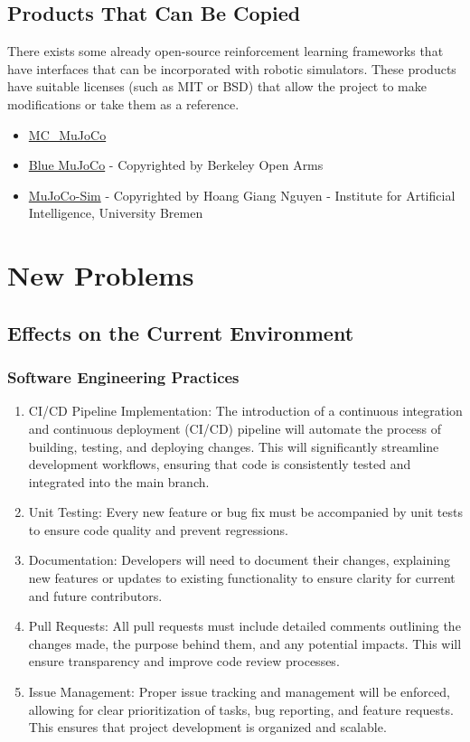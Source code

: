 \documentclass[12pt]{article}
\newcommand{\lips}{\textit{Insert your content here.}}
\begin{document}
\subsection{Products That Can Be Copied}
There exists some already open-source reinforcement learning frameworks that have interfaces that can be incorporated with robotic simulators. These products have suitable licenses (such as MIT or BSD) that allow the project to make modifications or take them as a reference.
\begin{itemize}
  \item \href{https://github.com/rohanpsingh/mc\_mujoco}{MC\_MuJoCo}
  \item \href{https://github.com/berkeleyopenarms/blue_mujoco_v1?tab=readme-ov-file}{Blue MuJoCo} - Copyrighted by Berkeley Open Arms
  \item \href{https://github.com/HoangGiang93/mujoco_sim?tab=readme-ov-file}{MuJoCo-Sim} - Copyrighted by Hoang Giang Nguyen - Institute for Artificial Intelligence, University Bremen
\end{itemize}
\section{New Problems}
\subsection{Effects on the Current Environment}

\subsubsection{Software Engineering Practices}

\begin{enumerate}
  \item CI/CD Pipeline Implementation: The introduction of a continuous integration and continuous deployment (CI/CD) pipeline will automate the process of building, testing, and deploying changes. This will significantly streamline development workflows, ensuring that code is consistently tested and integrated into the main branch.
  \item Unit Testing: Every new feature or bug fix must be accompanied by unit tests to ensure code quality and prevent regressions.
  \item Documentation: Developers will need to document their changes, explaining new features or updates to existing functionality to ensure clarity for current and future contributors.
  \item Pull Requests: All pull requests must include detailed comments outlining the changes made, the purpose behind them, and any potential impacts. This will ensure transparency and improve code review processes.
  \item Issue Management: Proper issue tracking and management will be enforced, allowing for clear prioritization of tasks, bug reporting, and feature requests. This ensures that project development is organized and scalable.
\end{enumerate}
\end{document}
